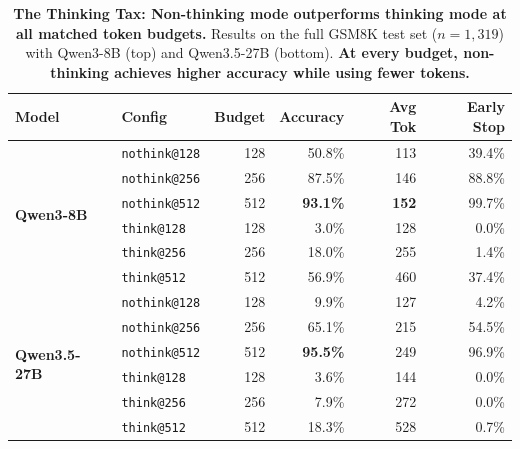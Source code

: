 \begin{table}[t]
\centering
\caption{\textbf{The Thinking Tax: Non-thinking mode outperforms thinking mode at all matched token budgets.}
Results on the full GSM8K test set ($n{=}1{,}319$) with Qwen3-8B (top) and Qwen3.5-27B (bottom).
\textbf{At every budget, non-thinking achieves higher accuracy while using fewer tokens.}}
\label{tab:thinking-tax}
\small
\begin{tabular}{ll rrrr}
\toprule
\textbf{Model} & \textbf{Config} & \textbf{Budget} & \textbf{Accuracy} & \textbf{Avg Tok} & \textbf{Early Stop} \\
\midrule
\multirow{6}{*}{\textbf{Qwen3-8B}}
& \texttt{nothink@128} & 128 & 50.8\%  & 113 & 39.4\% \\
& \texttt{nothink@256} & 256 & 87.5\%  & 146 & 88.8\% \\
& \texttt{nothink@512} & 512 & \textbf{93.1\%} & \textbf{152} & 99.7\% \\
\cmidrule{2-6}
& \texttt{think@128}   & 128 & 3.0\%   & 128 & 0.0\% \\
& \texttt{think@256}   & 256 & 18.0\%  & 255 & 1.4\% \\
& \texttt{think@512}   & 512 & 56.9\%  & 460 & 37.4\% \\
\midrule
\multirow{6}{*}{\textbf{Qwen3.5-27B}}
& \texttt{nothink@128} & 128 & 9.9\%   & 127 & 4.2\% \\
& \texttt{nothink@256} & 256 & 65.1\%  & 215 & 54.5\% \\
& \texttt{nothink@512} & 512 & \textbf{95.5\%} & 249 & 96.9\% \\
\cmidrule{2-6}
& \texttt{think@128}   & 128 & 3.6\%   & 144 & 0.0\% \\
& \texttt{think@256}   & 256 & 7.9\%   & 272 & 0.0\% \\
& \texttt{think@512}   & 512 & 18.3\%  & 528 & 0.7\% \\
\bottomrule
\end{tabular}
\vspace{-2mm}
\end{table}
